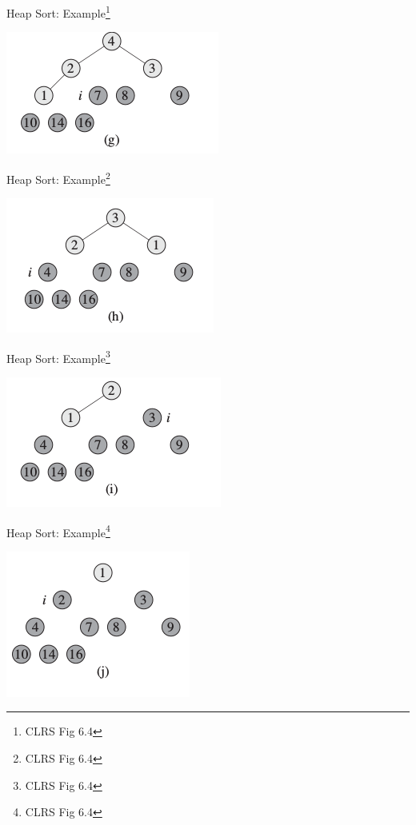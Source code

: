 \documentclass{beamer}
\begin{document}
\begin{frame}{Heap Sort: Example\footnote{CLRS Fig 6.4}}
    \begin{center}
        \includegraphics[scale=0.5]{heapSort7.png}
    \end{center}
\end{frame}


\begin{frame}{Heap Sort: Example\footnote{CLRS Fig 6.4}}
    \begin{center}
        \includegraphics[scale=0.5]{heapSort8.png}
    \end{center}
\end{frame}


\begin{frame}{Heap Sort: Example\footnote{CLRS Fig 6.4}}
    \begin{center}
        \includegraphics[scale=0.5]{heapSort9.png}
    \end{center}
\end{frame}


\begin{frame}{Heap Sort: Example\footnote{CLRS Fig 6.4}}
    \begin{center}
        \includegraphics[scale=0.5]{heapSort10.png}
    \end{center}
\end{frame}
\end{document}
